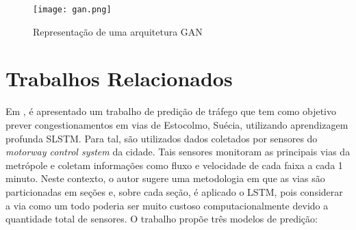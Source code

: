 \begin{figure}[htbp]
    \centering
    \texttt{[image: gan.png]}
    \label{figure:eixo}
    \caption[Representação de uma arquitetura GAN]{Representação de uma arquitetura GAN\footnotemark}
\end{figure}







\section{Trabalhos Relacionados}

Em \cite{Zainab_2018}, é apresentado um trabalho de predição de tráfego que tem como objetivo prever congestionamentos em vias de Estocolmo, Suécia, utilizando aprendizagem profunda \acrfull{SLSTM}. Para tal, são utilizados dados coletados por sensores do \textit{motorway control system} da cidade. Tais sensores monitoram as principais vias da metrópole e coletam informações como fluxo e velocidade de cada faixa a cada 1 minuto. Neste contexto, o autor sugere uma metodologia em que as vias são particionadas em seções e, sobre cada seção, é aplicado o \acrshort{LSTM}, pois considerar a via como um todo poderia ser muito custoso computacionalmente devido a quantidade total de sensores. O trabalho propõe três modelos de predição:

